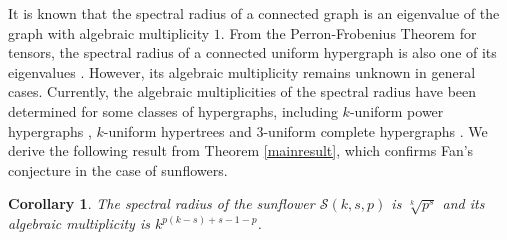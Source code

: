 \documentclass{article}
\newtheorem{cor}[thm]{Corollary}
\begin{document}
It is known that the spectral radius of a connected graph is an eigenvalue of the graph with algebraic multiplicity $1$.
From the Perron-Frobenius Theorem for tensors,
the spectral radius of a connected uniform hypergraph is also one of its eigenvalues \cite{chang2008perron}.
However, its algebraic multiplicity remains unknown in general cases.
Currently, the algebraic multiplicities of the spectral radius have been determined for some classes of hypergraphs,
including $k$-uniform power hypergraphs \cite{chen2024spectra}, $k$-uniform hypertrees \cite{chen2024multiplicity} and $3$-uniform complete hypergraphs \cite{zheng2021complete}.
We derive the following result from Theorem \ref{mainresult},
which confirms Fan's conjecture \citep[Conjecture 5.5]{fan2024themultiplicity} in the case of sunflowers.

\begin{cor}
The spectral radius of the sunflower $\mathcal{S}(k,s,p)$ is $\sqrt[k]{p^s}$ and its algebraic multiplicity is $k^{p(k-s)+s-1-p}$.
\end{cor}




\end{document}
